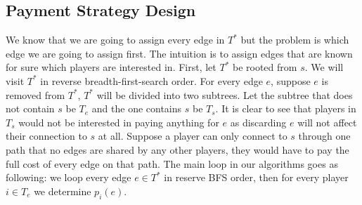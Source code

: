 \documentclass[11pt,psfig,times]{article}
\begin{document}
\subsection{Payment Strategy Design}
We know that we are going to assign every edge in \(T^*\) but the problem is which edge we are going to assign first. The intuition is to assign edges that are known for sure which players are interested in. First, let \(T^*\) be rooted from \(s\). We will visit \(T^*\) in reverse breadth-first-search order. For every edge \(e\), suppose \(e\) is removed from \(T^*\), \(T^*\) will be divided into two subtrees. Let the subtree that does not contain \(s\) be \(T_e\) and the one contains \(s\) be \(T_s\). It is clear to see that players in \(T_s\) would not be interested in paying anything for \(e\) as discarding \(e\) will not affect their connection to \(s\) at all. Suppose a player can only connect to \(s\) through one path that no edges are shared by any other players, they would have to pay the full cost of every edge on that path. The main loop in our algorithms goes as following: we loop every edge \(e \in T^*\) in reserve BFS order, then for every player \(i \in T_e\) we determine \(p_i(e)\).

\begin{figure}
	\begin{center}
	\end{center}
\end{figure}
\end{document}
